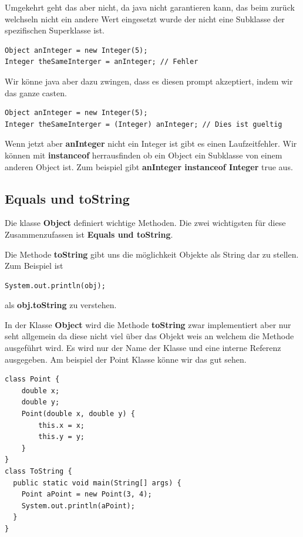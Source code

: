 \documentclass[12pt]{article}
\begin{document}
    Umgekehrt geht das aber nicht, da java nicht garantieren kann, das beim zurück welchseln nicht ein andere Wert eingesetzt wurde der nicht 
    eine Subklasse der spezifischen Superklasse ist. 

    \begin{lstlisting}[caption=fehler]
Object anInteger = new Integer(5);
Integer theSameInterger = anInteger; // Fehler
    \end{lstlisting}

    Wir könne java aber dazu zwingen, dass es diesen prompt akzeptiert, indem wir das ganze casten. 

    \begin{lstlisting}[caption=casting]
Object anInteger = new Integer(5);
Integer theSameInterger = (Integer) anInteger; // Dies ist gueltig
    \end{lstlisting}

    Wenn jetzt aber \textbf{anInteger} nicht ein Integer ist gibt es einen 
    Laufzeitfehler. Wir können mit \textbf{instanceof} herrausfinden ob ein Object ein Subklasse von einem anderen Object ist. 
    Zum beispiel gibt \textbf{anInteger instanceof Integer} true aus. 

    \subsection*{Equals und toString}

    Die klasse \textbf{Object} definiert wichtige Methoden. Die zwei wichtigsten für diese 
    Zusammenzufassen ist \textbf{Equals und toString}. 

    Die Methode \textbf{toString} gibt uns die möglichkeit Objekte als String dar zu stellen. 
    Zum Beispiel ist 

    \begin{lstlisting}[caption=toString]
System.out.println(obj);
    \end{lstlisting}

    als \textbf{obj.toString } zu verstehen.

    In der Klasse \textbf{Object} wird die Methode \textbf{toString} zwar implementiert aber nur seht allgemein 
    da diese nicht viel über das Objekt weis an welchem die Methode ausgeführt wird. Es wird nur der Name der Klasse
    und eine interne Referenz ausgegeben. 
    Am beispiel der Point Klasse könne wir das gut sehen. 

    \begin{lstlisting}[caption=Point]
class Point {
    double x;
    double y;
    Point(double x, double y) {
        this.x = x;
        this.y = y;
    }
}
class ToString {
  public static void main(String[] args) {
    Point aPoint = new Point(3, 4);
    System.out.println(aPoint);
  }
}
    \end{lstlisting}
\end{document}
